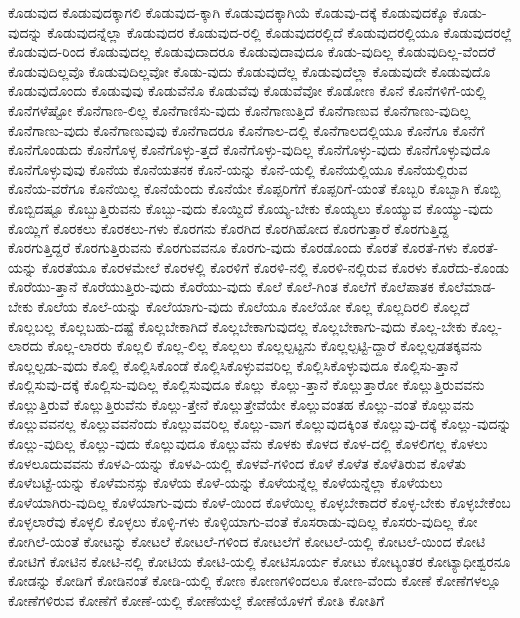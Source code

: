 {ಕೊಡುವುದ
ಕೊಡುವುದಕ್ಕಾಗಲಿ
ಕೊಡುವುದ-ಕ್ಕಾಗಿ
ಕೊಡುವುದಕ್ಕಾಗಿಯೆ
ಕೊಡುವು-ದಕ್ಕೆ
ಕೊಡುವುದಕ್ಕೊ
ಕೊಡು-ವುದನ್ನು
ಕೊಡುವುದನ್ನೆಲ್ಲಾ
ಕೊಡುವುದರ
ಕೊಡುವುದ-ರಲ್ಲಿ
ಕೊಡುವುದರಲ್ಲಿದೆ
ಕೊಡುವುದರಲ್ಲಿಯೂ
ಕೊಡುವುದರಲ್ಲೆ
ಕೊಡುವುದ-ರಿಂದ
ಕೊಡುವುದಲ್ಲ
ಕೊಡುವುದಾದರೂ
ಕೊಡುವುದಾವುದೂ
ಕೊಡು-ವುದಿಲ್ಲ
ಕೊಡುವುದಿಲ್ಲ-ವೆಂದರೆ
ಕೊಡುವುದಿಲ್ಲವೊ
ಕೊಡುವುದಿಲ್ಲವೋ
ಕೊಡು-ವುದು
ಕೊಡುವುದೆಲ್ಲ
ಕೊಡುವುದೆಲ್ಲಾ
ಕೊಡುವುದೇ
ಕೊಡುವುದೊ
ಕೊಡುವುದೊಂದು
ಕೊಡುವುವು
ಕೊಡುವೆನೊ
ಕೊಡುವೆವು
ಕೊಡುವೆವೋ
ಕೊಡೋಣ
ಕೊನೆ
ಕೊನೆಗಳಿಗೆ-ಯಲ್ಲಿ
ಕೊನೆಗಳೆಷ್ಟೋ
ಕೊನೆಗಾಣ-ಲಿಲ್ಲ
ಕೊನೆಗಾಣಿಸು-ವುದು
ಕೊನೆಗಾಣುತ್ತಿದೆ
ಕೊನೆಗಾಣುವ
ಕೊನೆಗಾಣು-ವುದಿಲ್ಲ
ಕೊನೆಗಾಣು-ವುದು
ಕೊನೆಗಾಣುವುವು
ಕೊನೆಗಾದರೂ
ಕೊನೆಗಾಲ-ದಲ್ಲಿ
ಕೊನೆಗಾಲದಲ್ಲಿಯೂ
ಕೊನೆಗೂ
ಕೊನೆಗೆ
ಕೊನೆಗೊಂಡುದು
ಕೊನೆಗೊಳ್ಳ
ಕೊನೆಗೊಳ್ಳು-ತ್ತದೆ
ಕೊನೆಗೊಳ್ಳು-ವುದಿಲ್ಲ
ಕೊನೆಗೊಳ್ಳು-ವುದು
ಕೊನೆಗೊಳ್ಳುವುದೊ
ಕೊನೆಗೊಳ್ಳುವುವು
ಕೊನೆಯ
ಕೊನೆಯತನಕ
ಕೊನೆ-ಯನ್ನು
ಕೊನೆ-ಯಲ್ಲಿ
ಕೊನೆಯಲ್ಲಿಯೂ
ಕೊನೆಯಲ್ಲಿರುವ
ಕೊನೆಯ-ವರೆಗೂ
ಕೊನೆಯಿಲ್ಲ
ಕೊನೆಯೆಂದು
ಕೊನೆಯೇ
ಕೊಪ್ಪರಿಗೆಗೆ
ಕೊಪ್ಪರಿಗೆ-ಯಂತೆ
ಕೊಬ್ಬರಿ
ಕೊಬ್ಬಾಗಿ
ಕೊಬ್ಬಿ
ಕೊಬ್ಬಿದಷ್ಟೂ
ಕೊಬ್ಬುತ್ತಿರುವನು
ಕೊಬ್ಬು-ವುದು
ಕೊಯ್ದಿದೆ
ಕೊಯ್ಯ-ಬೇಕು
ಕೊಯ್ಯಲು
ಕೊಯ್ಯುವ
ಕೊಯ್ಯು-ವುದು
ಕೊಯ್ಲಿಗೆ
ಕೊರಕಲು
ಕೊರಕಲು-ಗಳು
ಕೊರಗನು
ಕೊರಗಿದ
ಕೊರಗಿಹೋದ
ಕೊರಗುತ್ತಾರೆ
ಕೊರಗುತ್ತಿದ್ದ
ಕೊರಗುತ್ತಿದ್ದರೆ
ಕೊರಗುತ್ತಿರುವನು
ಕೊರಗುವವನೂ
ಕೊರಗು-ವುದು
ಕೊರಡೊಂದು
ಕೊರತೆ
ಕೊರತೆ-ಗಳು
ಕೊರತೆ-ಯನ್ನು
ಕೊರತೆಯೂ
ಕೊರಳಮೇಲೆ
ಕೊರಳಲ್ಲಿ
ಕೊರಳಿಗೆ
ಕೊರಳಿ-ನಲ್ಲಿ
ಕೊರಳಿ-ನಲ್ಲಿರುವ
ಕೊರಳು
ಕೊರೆದು-ಕೊಂಡು
ಕೊರೆಯು-ತ್ತಾನೆ
ಕೊರೆಯುತ್ತಿರು-ವುದು
ಕೊರೆಯು-ವುದು
ಕೊಲೆ
ಕೊಲೆ-ಗಿಂತ
ಕೊಲೆಗೆ
ಕೊಲೆಪಾತಕ
ಕೊಲೆಮಾಡ-ಬೇಕು
ಕೊಲೆಯ
ಕೊಲೆ-ಯನ್ನು
ಕೊಲೆಯಾಗು-ವುದು
ಕೊಲೆಯೂ
ಕೊಲೆಯೋ
ಕೊಲ್ಲ
ಕೊಲ್ಲದಿರಲಿ
ಕೊಲ್ಲದೆ
ಕೊಲ್ಲಬಲ್ಲ
ಕೊಲ್ಲಬಹು-ದಷ್ಟೆ
ಕೊಲ್ಲಬೇಕಾಗಿದೆ
ಕೊಲ್ಲಬೇಕಾಗುವುದಲ್ಲ
ಕೊಲ್ಲಬೇಕಾಗು-ವುದು
ಕೊಲ್ಲ-ಬೇಕು
ಕೊಲ್ಲ-ಲಾರದು
ಕೊಲ್ಲ-ಲಾರರು
ಕೊಲ್ಲಲಿ
ಕೊಲ್ಲ-ಲಿಲ್ಲ
ಕೊಲ್ಲಲು
ಕೊಲ್ಲಲ್ಪಟ್ಟನು
ಕೊಲ್ಲಲ್ಪಟ್ಟಿ-ದ್ದಾರೆ
ಕೊಲ್ಲಲ್ಪಡತಕ್ಕವನು
ಕೊಲ್ಲಲ್ಪಡು-ವುದು
ಕೊಲ್ಲಿ
ಕೊಲ್ಲಿಸಿಕೊಂಡೆ
ಕೊಲ್ಲಿಸಿಕೊಳ್ಳುವವರಿಲ್ಲ
ಕೊಲ್ಲಿಸಿಕೊಳ್ಳುವುದೂ
ಕೊಲ್ಲಿಸು-ತ್ತಾನೆ
ಕೊಲ್ಲಿಸುವು-ದಕ್ಕೆ
ಕೊಲ್ಲಿಸು-ವುದಿಲ್ಲ
ಕೊಲ್ಲಿಸುವುದೂ
ಕೊಲ್ಲು
ಕೊಲ್ಲು-ತ್ತಾನೆ
ಕೊಲ್ಲುತ್ತಾರೋ
ಕೊಲ್ಲುತ್ತಿರುವವನು
ಕೊಲ್ಲುತ್ತಿರುವೆ
ಕೊಲ್ಲುತ್ತಿರುವೆನು
ಕೊಲ್ಲು-ತ್ತೇನೆ
ಕೊಲ್ಲುತ್ತೇವೆಯೇ
ಕೊಲ್ಲುವಂತಹ
ಕೊಲ್ಲು-ವಂತೆ
ಕೊಲ್ಲುವನು
ಕೊಲ್ಲುವವನಲ್ಲ
ಕೊಲ್ಲುವವನೆಂದು
ಕೊಲ್ಲುವವರಿಲ್ಲ
ಕೊಲ್ಲು-ವಾಗ
ಕೊಲ್ಲುವುದಕ್ಕಿಂತ
ಕೊಲ್ಲುವು-ದಕ್ಕೆ
ಕೊಲ್ಲು-ವುದನ್ನು
ಕೊಲ್ಲು-ವುದಿಲ್ಲ
ಕೊಲ್ಲು-ವುದು
ಕೊಲ್ಲುವುದೂ
ಕೊಲ್ಲುವೆನು
ಕೊಳಕು
ಕೊಳದ
ಕೊಳ-ದಲ್ಲಿ
ಕೊಳಲಿಗಲ್ಲ
ಕೊಳಲು
ಕೊಳಲೂದುವವನು
ಕೊಳವಿ-ಯನ್ನು
ಕೊಳವಿ-ಯಲ್ಲಿ
ಕೊಳವೆ-ಗಳಿಂದ
ಕೊಳೆ
ಕೊಳೆತ
ಕೊಳೆತಿರುವ
ಕೊಳೆತು
ಕೊಳೆಬಟ್ಟೆ-ಯನ್ನು
ಕೊಳೆಮನಸ್ಸು
ಕೊಳೆಯ
ಕೊಳೆ-ಯನ್ನು
ಕೊಳೆಯನ್ನೆಲ್ಲ
ಕೊಳೆಯನ್ನೆಲ್ಲಾ
ಕೊಳೆಯಲು
ಕೊಳೆಯಾಗಿರು-ವುದಿಲ್ಲ
ಕೊಳೆಯಾಗು-ವುದು
ಕೊಳೆ-ಯಿಂದ
ಕೊಳೆಯಿಲ್ಲ
ಕೊಳ್ಳಬೇಕಾದರೆ
ಕೊಳ್ಳ-ಬೇಕು
ಕೊಳ್ಳಬೇಕೆಂಬ
ಕೊಳ್ಳಲಾರೆವು
ಕೊಳ್ಳಲಿ
ಕೊಳ್ಳಲು
ಕೊಳ್ಳಿ-ಗಳು
ಕೊಳ್ಳಿಯಾಗು-ವಂತೆ
ಕೊಸರಾಡು-ವುದಿಲ್ಲ
ಕೊಸರು-ವುದಿಲ್ಲ
ಕೋ
ಕೋಗಿಲೆ-ಯಂತೆ
ಕೋಟನ್ನು
ಕೋಟಲೆ
ಕೋಟಲೆ-ಗಳಿಂದ
ಕೋಟಲೆಗೆ
ಕೋಟಲೆ-ಯಲ್ಲಿ
ಕೋಟಲೆ-ಯಿಂದ
ಕೋಟಿ
ಕೋಟಿಗೆ
ಕೋಟಿನ
ಕೋಟಿ-ನಲ್ಲಿ
ಕೋಟಿಯ
ಕೋಟಿ-ಯಲ್ಲಿ
ಕೋಟಿಸೂರ್ಯ
ಕೋಟು
ಕೋಟ್ಯಂತರ
ಕೋಟ್ಯಾಧೀಶ್ವರನೂ
ಕೋಡನ್ನು
ಕೋಡಿಗೆ
ಕೋಡಿನಂತೆ
ಕೋಡಿ-ಯಲ್ಲಿ
ಕೋಣ
ಕೋಣಗಳಿಂದಲೂ
ಕೋಣ-ವೆಂದು
ಕೋಣೆ
ಕೋಣೆಗಳಲ್ಲೂ
ಕೋಣೆಗಳಿರುವ
ಕೋಣೆಗೆ
ಕೋಣೆ-ಯಲ್ಲಿ
ಕೋಣೆಯಲ್ಲೆ
ಕೋಣೆಯೊಳಗೆ
ಕೋತಿ
ಕೋತಿಗೆ
}
